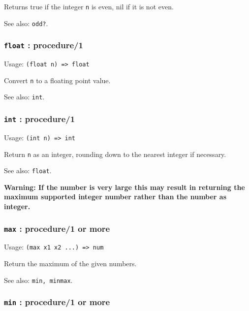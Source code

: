 \documentclass[
]{article}
\newcommand{\passthrough}[1]{#1}
\begin{document}
Returns true if the integer \passthrough{\lstinline!n!} is even, nil if
it is not even.

See also: \passthrough{\lstinline!odd?!}.

\hypertarget{float-procedure1}{%
\subsubsection{\texorpdfstring{\texttt{float} :
procedure/1}{float : procedure/1}}\label{float-procedure1}}

Usage: \passthrough{\lstinline!(float n) => float!}

Convert \passthrough{\lstinline!n!} to a floating point value.

See also: \passthrough{\lstinline!int!}.

\hypertarget{int-procedure1}{%
\subsubsection{\texorpdfstring{\texttt{int} :
procedure/1}{int : procedure/1}}\label{int-procedure1}}

Usage: \passthrough{\lstinline!(int n) => int!}

Return \passthrough{\lstinline!n!} as an integer, rounding down to the
nearest integer if necessary.

See also: \passthrough{\lstinline!float!}.

\textbf{Warning: If the number is very large this may result in
returning the maximum supported integer number rather than the number as
integer.}

\hypertarget{max-procedure1-or-more}{%
\subsubsection{\texorpdfstring{\texttt{max} : procedure/1 or
more}{max : procedure/1 or more}}\label{max-procedure1-or-more}}

Usage: \passthrough{\lstinline!(max x1 x2 ...) => num!}

Return the maximum of the given numbers.

See also: \passthrough{\lstinline!min, minmax!}.

\hypertarget{min-procedure1-or-more}{%
\subsubsection{\texorpdfstring{\texttt{min} : procedure/1 or
more}{min : procedure/1 or more}}\label{min-procedure1-or-more}}
\end{document}
